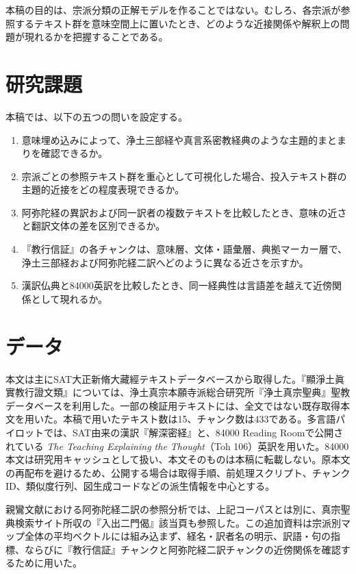 \documentclass[uplatex,dvipdfmx,11pt,a4paper]{jsarticle}
\begin{document}
本稿の目的は、宗派分類の正解モデルを作ることではない。むしろ、各宗派が参照するテキスト群を意味空間上に置いたとき、どのような近接関係や解釈上の問題が現れるかを把握することである。

\section{研究課題}

本稿では、以下の五つの問いを設定する。

\begin{enumerate}
  \item 意味埋め込みによって、浄土三部経や真言系密教経典のような主題的まとまりを確認できるか。
  \item 宗派ごとの参照テキスト群を重心として可視化した場合、投入テキスト群の主題的近接をどの程度表現できるか。
  \item 阿弥陀経の異訳および同一訳者の複数テキストを比較したとき、意味の近さと翻訳文体の差を区別できるか。
  \item 『教行信証』の各チャンクは、意味層、文体・語彙層、典拠マーカー層で、浄土三部経および阿弥陀経二訳へどのように異なる近さを示すか。
  \item 漢訳仏典と84000英訳を比較したとき、同一経典性は言語差を越えて近傍関係として現れるか。
\end{enumerate}

\section{データ}

本文は主にSAT大正新脩大藏經テキストデータベースから取得した。『顯淨土眞實教行證文類』については、浄土真宗本願寺派総合研究所『浄土真宗聖典』聖教データベースを利用した。一部の検証用テキストには、全文ではない既存取得本文を用いた。本稿で用いたテキスト数は15、チャンク数は433である。多言語パイロットでは、SAT由来の漢訳『解深密経』と、84000 Reading Roomで公開されている \textit{The Teaching Explaining the Thought}（Toh 106）英訳を用いた。84000本文は研究用キャッシュとして扱い、本文そのものは本稿に転載しない。原本文の再配布を避けるため、公開する場合は取得手順、前処理スクリプト、チャンクID、類似度行列、図生成コードなどの派生情報を中心とする。

親鸞文献における阿弥陀経二訳の参照分析では、上記コーパスとは別に、真宗聖典検索サイト所収の『入出二門偈』該当頁も参照した。この追加資料は宗派別マップ全体の平均ベクトルには組み込まず、経名・訳者名の明示、訳語・句の指標、ならびに『教行信証』チャンクと阿弥陀経二訳チャンクの近傍関係を確認するために用いた。
\end{document}
